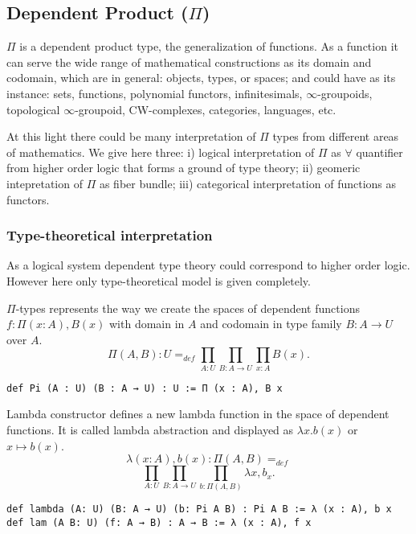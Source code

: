 \documentclass{article}
\begin{document}
\subsection{Dependent Product ($\Pi$)}

$\Pi$ is a dependent product type, the generalization of functions.
As a function it can serve the wide range of mathematical constructions as its domain and codomain,
which are in general: objects, types, or spaces; and could have as its
instance: sets, functions, polynomial functors, infinitesimals, $\infty$-groupoids,
topological $\infty$-groupoid, CW-complexes,
categories, languages, etc.

At this light there could be many interpretation of $\Pi$ types from different
areas of mathematics. We give here three:
i) logical interpretation of $\Pi$ as $\forall$ quantifier from higher order logic that forms a ground of type theory;
ii) geomeric intepretation of $\Pi$ as fiber bundle;
iii) categorical interpretation of functions as functors.

\subsubsection*{Type-theoretical interpretation}

As a logical system dependent type theory could correspond to higher order logic.
However here only type-theoretical model is given completely.

\begin{definition}[$\Pi$-Formation]
$\Pi$-types represents the way we create the spaces of
dependent functions $f: \Pi(x:A), B(x)$ with domain
in $A$ and codomain in type family $B : A \rightarrow U$ over $A$.
$$
  \Pi(A,B) : U =_{def} \prod_{A:U}\prod_{B: A \rightarrow U}\prod_{x:A}B(x).
$$
\begin{lstlisting}[mathescape=true]
def Pi (A : U) (B : A → U) : U := Π (x : A), B x
\end{lstlisting}
\end{definition}

\begin{definition}[$\Pi$-Introduction]
Lambda constructor defines a new lambda function in the space of dependent functions.
It is called lambda abstraction and displayed as $\lambda x. b(x)$ or $x \mapsto b(x)$.
$$
  \lambda (x: A), b(x) : \Pi(A,B) =_{def}
$$
$$
  \prod_{A:U}\prod_{B:A \rightarrow U}\prod_{b:\Pi(A,B)}\lambda x, b_x.
$$
\begin{lstlisting}[mathescape=true]
def lambda (A: U) (B: A → U) (b: Pi A B) : Pi A B := λ (x : A), b x
def lam (A B: U) (f: A → B) : A → B := λ (x : A), f x
\end{lstlisting}
\end{definition}
\end{document}
